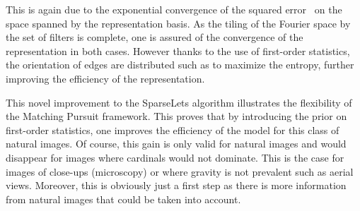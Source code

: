 \documentclass[a4paper, 11pt]{book}
\begin{document}
This is again due to the exponential convergence of the squared error~\citep[p.~422]{Mallat98} on the space spanned by the representation basis.
As the tiling of the Fourier space by the set of filters is complete, 
one is assured of the convergence of the representation in both cases.
However thanks to the use of first-order statistics, the orientation of edges are distributed such as to maximize the entropy, further improving the efficiency of the representation.

This novel improvement to the SparseLets algorithm illustrates the flexibility of the Matching Pursuit framework. %
This proves that by introducing the prior on first-order statistics, one improves the efficiency of the model for this class of natural images.
Of course, this gain is only valid for natural images and would disappear for images where cardinals would not dominate. This is the case for images of close-ups (microscopy) or where gravity is not prevalent such as aerial views.
Moreover, this is obviously just a first step as there is more information from natural images that could be taken into account.

\end{document}
